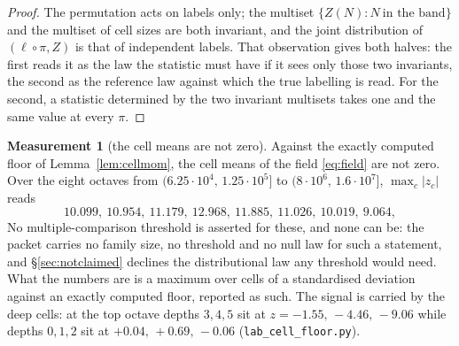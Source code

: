 \documentclass[11pt,a4paper]{article}
\theoremstyle{plain}
\theoremstyle{definition}
\newtheorem{measurement}[theorem]{Measurement}
\theoremstyle{remark}
\begin{document}
\begin{proof}
The permutation acts on labels only; the multiset
$\{Z(N):N\ \text{in the band}\}$ and the multiset of cell sizes are
both invariant, and the joint distribution of $(\ell\circ\pi,Z)$ is
that of independent labels. That observation gives both halves: the
first reads it as the law the statistic must have if it sees only
those two invariants, the second as the reference law against which
the true labelling is read. For the second, a statistic determined by the two
invariant multisets takes one and the same value at every $\pi$.
\end{proof}

\begin{measurement}[the cell means are not zero]\label{meas:notzero}
Against the exactly computed floor of Lemma~\ref{lem:cellmom}, the
cell means of the field \eqref{eq:field} are not zero. Over the eight
octaves from $(6.25\cdot10^4,\,1.25\cdot10^5]$ to
$(8\cdot10^6,\,1.6\cdot10^7]$, $\max_c|z_c|$ reads
\[
  10.099,\ 10.954,\ 11.179,\ 12.968,\ 11.885,\ 11.026,\ 10.019,\ 9.064,
\]
No multiple-comparison threshold is asserted for these, and none can
be: the packet carries no family size, no threshold and no null law
for such a statement, and \S\ref{sec:notclaimed} declines the
distributional law any threshold would need. What the numbers are is a maximum over
cells of a standardised deviation against an exactly computed floor,
reported as such. The signal is carried by the deep cells:
at the top octave depths $3,4,5$ sit at $z=-1.55,\,-4.46,\,-9.06$
while depths $0,1,2$ sit at $+0.04,\,+0.69,\,-0.06$
(\texttt{lab\_cell\_floor.py}).
\end{measurement}
\end{document}
